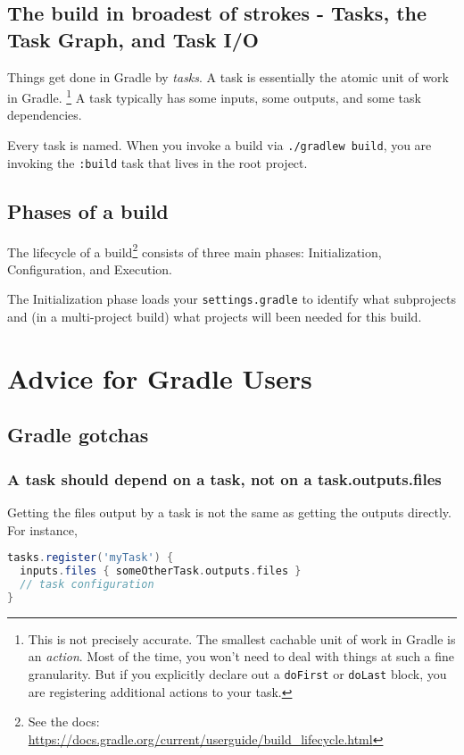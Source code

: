 \documentclass[]{article}
\theoremstyle{definition}
\begin{document}
\subsection{The build in broadest of strokes - Tasks, the Task Graph, and Task I/O}

Things get done in Gradle by \emph{tasks}.
A task is essentially the atomic unit of work in Gradle.%
\footnote{This is not precisely accurate.
  The smallest cachable unit of work in Gradle is an \emph{action}.
  Most of the time, you won't need to deal with things at such a fine granularity.
  But if you explicitly declare out a \texttt{doFirst} or \texttt{doLast} block, you are registering additional actions to your task.
}
A task typically has some inputs, some outputs, and some task dependencies.

Every task is named.
When you invoke a build via \texttt{./gradlew build}, you are invoking the \texttt{:build} task that lives in the root project.

\subsection{Phases of a build}
The lifecycle of a build\footnote{See the docs: \url{https://docs.gradle.org/current/userguide/build_lifecycle.html}} consists of three main phases: Initialization, Configuration, and Execution.

The Initialization phase loads your \texttt{settings.gradle} to identify what subprojects and (in a multi-project build) what projects will been needed for this build.



\section{Advice for Gradle Users}

\subsection{Gradle gotchas}

\subsubsection{A task should depend on a task, not on a task.outputs.files}
Getting the files output by a task is not the same as getting the outputs directly.  For instance,
\begin{lstlisting}[language=Groovy]
tasks.register('myTask') {
  inputs.files { someOtherTask.outputs.files }
  // task configuration
}
\end{lstlisting}
\end{document}
